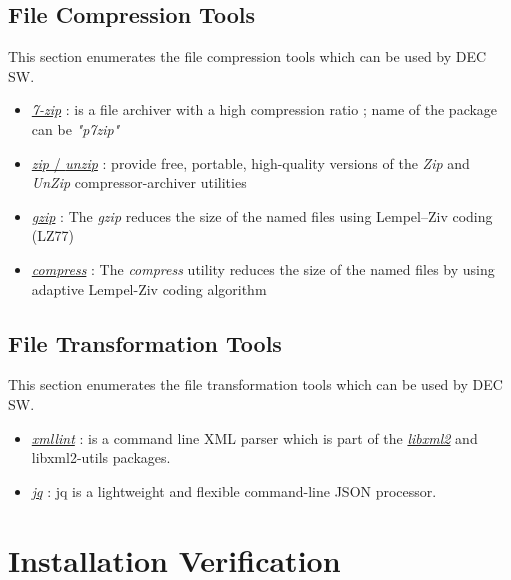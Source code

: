 \documentclass[dec_sum_main.tex]{subfiles}
\begin{document}
\subsection{File Compression Tools}
This section enumerates the file compression tools which can be used by DEC SW.
\par
\begin{itemize}
	\item \href{https://www.7-zip.org/}{\textit{7-zip}} : is a file archiver with a high compression ratio ; name of the package can be \textit{"p7zip"}
	\item \href{http://infozip.sourceforge.net}{\textit{zip} / \textit{unzip}} : provide free, portable, high-quality versions of the \textit{Zip} and \textit{UnZip} compressor-archiver utilities
	\item \href{https://www.gzip.org}{\textit{gzip}} : The \textit{gzip} reduces the size of the named files using Lempel–Ziv coding (LZ77)
	\item \href{http://man7.org/linux/man-pages/man1/compress.1p.html}{\textit{compress}} : The \textit{compress} utility reduces the size of the named files by using adaptive Lempel-Ziv coding algorithm
\end{itemize}

\subsection{File Transformation Tools}
This section enumerates the file transformation tools which can be used by DEC SW.

\begin{itemize}
	\item \href{http://xmlsoft.org/xmllint.html}{\textit{xmllint}} : is a command line XML parser which is part of the \href{http://xmlsoft.org}{\textit{libxml2}} and libxml2-utils packages.
    \item \href{https://stedolan.github.io/jq/}{\textit{jq}} : jq is a lightweight and flexible command-line JSON processor.	
\end{itemize}

\section{Installation Verification}
\end{document}
